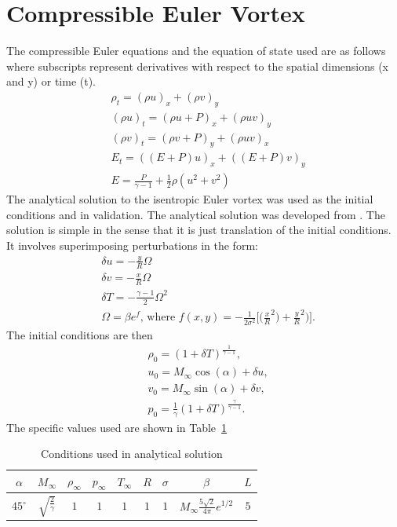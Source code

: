 \documentclass[preprints,article,accept,moreauthors,pdftex]{Definitions/mdpi}
\begin{document}
\section{Compressible Euler Vortex}
\label{Compressible-Euler}
The compressible Euler equations and the equation of state used are as follows where subscripts represent derivatives with respect to the spatial dimensions (x and y) or time (t).
\begin{align*}
    &\rho_t  = (\rho u)_x + (\rho v)_y \\ 
    &(\rho u)_t  = (\rho u+P)_x + (\rho u v)_y\\
    &(\rho v)_t  = (\rho v+P)_y + (\rho u v)_x\\
    &E_t = ((E+P)u)_x+((E+P)v)_y\\
    &E = \frac{P}{\gamma -1}+\frac{1}{2}\rho(u^2+v^2)
\end{align*}
The analytical solution to the isentropic Euler vortex was used as the initial conditions and in validation. The analytical solution was developed from \cite{SpiegelAMethods}. The solution is simple in the sense that it is just translation of the initial conditions. It involves superimposing perturbations in the form:
\begin{align*}
    &\delta u = -\frac{y}{R}\Omega\\
    &\delta v = -\frac{x}{R}\Omega\\
    &\delta T = -\frac{\gamma-1}{2} \Omega^2\\
    &\Omega = \beta e^{f}\text{, where } f(x,y) = -\frac{1}{2\sigma^2}\Bigg[\bigg(\frac{x}{R}^2\bigg)+\frac{y}{R}^2\bigg)\Bigg].
\end{align*}
The initial conditions are then 
\begin{align*}
    &\rho_0 = (1+\delta T)^{\frac{1}{\gamma-1}},\\
    &u_0 = M_\infty \cos(\alpha)+\delta u,\\
    &v_0 = M_\infty \sin(\alpha)+\delta v,\\
    &p_0 = \frac{1}{\gamma}(1+\delta T)^\frac{\gamma}{\gamma-1}.
\end{align*}
The specific values used are shown in Table~\ref{tab:eulerVortex}
\begin{table}[htb!]
    \centering
    \begin{tabular}{|c|c|c|c|c|c|c|c|c|}
    \hline
         $\alpha$ & $M_\infty$  & $\rho_\infty$ & $p_\infty$ & $T_\infty$ & $R$ & $\sigma$ & $\beta$ & $L$\\\hline
         $45^\circ$ &  $\sqrt{\frac{2}{\gamma}}$ & $1$ & $1$ & $1$ & $1$ & $1$ & $M_\infty \frac{5\sqrt{2}}{4\pi}e^{1/2}$ & $5$\\ \hline
    \end{tabular}
    \caption{Conditions used in analytical solution \cite{shu1998essentially}}
    \label{tab:eulerVortex}
\end{table}
\end{document}
